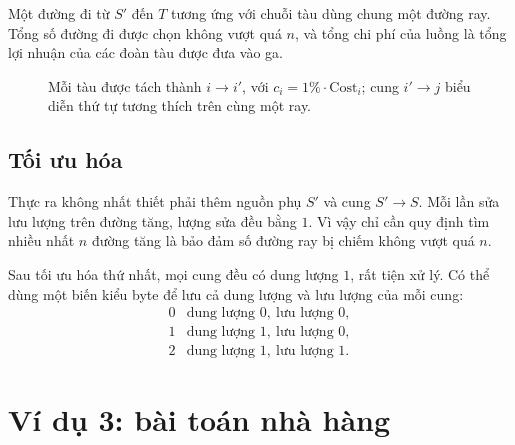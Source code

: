 \documentclass[11pt]{article}
\begin{document}
Một đường đi từ \(S'\) đến \(T\) tương ứng với chuỗi tàu dùng chung một đường
ray. Tổng số đường đi được chọn không vượt quá \(n\), và tổng chi phí của
luồng là tổng lợi nhuận của các đoàn tàu được đưa vào ga.

\begin{figure}[ht]
\centering
{}
\caption{Mỗi tàu được tách thành \(i\to i'\), với \(c_i=1\%\cdot\mathrm{Cost}_i\); cung \(i'\to j\) biểu diễn thứ tự tương thích trên cùng một ray.}
\end{figure}

\subsection{Tối ưu hóa}

Thực ra không nhất thiết phải thêm nguồn phụ \(S'\) và cung \(S'\to S\). Mỗi
lần sửa lưu lượng trên đường tăng, lượng sửa đều bằng \(1\). Vì vậy chỉ cần
quy định tìm nhiều nhất \(n\) đường tăng là bảo đảm số đường ray bị chiếm
không vượt quá \(n\).

Sau tối ưu hóa thứ nhất, mọi cung đều có dung lượng \(1\), rất tiện xử lý.
Có thể dùng một biến kiểu byte để lưu cả dung lượng và lưu lượng của mỗi
cung:
\[
\begin{array}{c|l}
0 & \text{dung lượng }0,\ \text{lưu lượng }0,\\
1 & \text{dung lượng }1,\ \text{lưu lượng }0,\\
2 & \text{dung lượng }1,\ \text{lưu lượng }1.
\end{array}
\]

\section{Ví dụ 3: bài toán nhà hàng}
\end{document}
